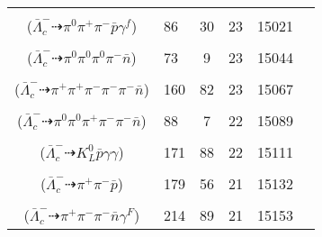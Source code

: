\documentclass[landscape]{article}
\newcounter{rownumbers}
\newcommand\rn{\stepcounter{rownumbers}\arabic{rownumbers}}
\newcommand{\EOL}{\\} %
\newcommand{\topoTags}[1]{#1} %
\begin{document}
\begin{longtable}{clcccc}
\rn & \makecell[l]{ $ 
\bar{\Lambda}_{c}^{-} \rightarrow \pi^{+} \pi^{-} \bar{\Sigma}^{-} \gamma^{f} ,
\bar{\Sigma}^{-} \rightarrow \pi^{0} \bar{p} 
$ \\ ($
\bar{\Lambda}_{c}^{-} \dashrightarrow \pi^{0} \pi^{+} \pi^{-} \bar{p} \gamma^{f} 
$) } & \topoTags{86 & 30 & }23 & 15021 \EOL

\rn & \makecell[l]{ $ 
\bar{\Lambda}_{c}^{-} \rightarrow \rho^{-} \bar{\Sigma}^{*0} ,
\rho^{-} \rightarrow \pi^{0} \pi^{-} ,
\bar{\Sigma}^{*0} \rightarrow \pi^{0} \bar{\Lambda} ,
\bar{\Lambda} \rightarrow \pi^{0} \bar{n} 
$ \\ ($
\bar{\Lambda}_{c}^{-} \dashrightarrow \pi^{0} \pi^{0} \pi^{0} \pi^{-} \bar{n} 
$) } & \topoTags{73 & 9 & }23 & 15044 \EOL

\rn & \makecell[l]{ $ 
\bar{\Lambda}_{c}^{-} \rightarrow \pi^{+} \pi^{+} \pi^{-} \pi^{-} \bar{\Sigma}^{-} ,
\bar{\Sigma}^{-} \rightarrow \pi^{-} \bar{n} 
$ \\ ($
\bar{\Lambda}_{c}^{-} \dashrightarrow \pi^{+} \pi^{+} \pi^{-} \pi^{-} \pi^{-} \bar{n} 
$) } & \topoTags{160 & 82 & }23 & 15067 \EOL

\rn & \makecell[l]{ $ 
\bar{\Lambda}_{c}^{-} \rightarrow \omega \bar{\Sigma}^{*-} ,
\omega \rightarrow \pi^{0} \pi^{+} \pi^{-} ,
\bar{\Sigma}^{*-} \rightarrow \pi^{-} \bar{\Lambda} ,
\bar{\Lambda} \rightarrow \pi^{0} \bar{n} 
$ \\ ($
\bar{\Lambda}_{c}^{-} \dashrightarrow \pi^{0} \pi^{0} \pi^{+} \pi^{-} \pi^{-} \bar{n} 
$) } & \topoTags{88 & 7 & }22 & 15089 \EOL

\rn & \makecell[l]{ $ 
\bar{\Lambda}_{c}^{-} \rightarrow \eta K^{0} \bar{p} ,
\eta \rightarrow \gamma \gamma ,
K^{0} \rightarrow K_{L}^{0} 
$ \\ ($
\bar{\Lambda}_{c}^{-} \dashrightarrow K_{L}^{0} \bar{p} \gamma \gamma 
$) } & \topoTags{171 & 88 & }22 & 15111 \EOL

\rn & \makecell[l]{ $ 
\bar{\Lambda}_{c}^{-} \rightarrow \pi^{-} \bar{\Lambda} ,
\bar{\Lambda} \rightarrow \pi^{+} \bar{p} 
$ \\ ($
\bar{\Lambda}_{c}^{-} \dashrightarrow \pi^{+} \pi^{-} \bar{p} 
$) } & \topoTags{179 & 56 & }21 & 15132 \EOL

\rn & \makecell[l]{ $ 
\bar{\Lambda}_{c}^{-} \rightarrow \eta^{\prime} \bar{\Sigma}^{-} ,
\eta^{\prime} \rightarrow \pi^{+} \pi^{-} \gamma^{F} ,
\bar{\Sigma}^{-} \rightarrow \pi^{-} \bar{n} 
$ \\ ($
\bar{\Lambda}_{c}^{-} \dashrightarrow \pi^{+} \pi^{-} \pi^{-} \bar{n} \gamma^{F} 
$) } & \topoTags{214 & 89 & }21 & 15153 \EOL


\end{longtable}
\end{document}
